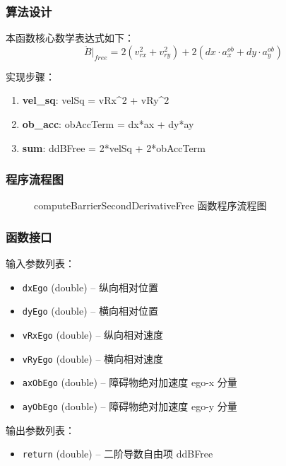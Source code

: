 \documentclass[a4paper,10pt]{article}
\begin{document}
\subsubsection{算法设计}
\par 本函数核心数学表达式如下：
\begin{equation}
\ddot B|_{free} = 2(v_{rx}^2 + v_{ry}^2) + 2(dx \cdot a_x^{ob} + dy \cdot a_y^{ob})
\end{equation}
\par 实现步骤：
\begin{enumerate}
  \item \textbf{vel\_sq}: velSq = vRx\textasciicircum{}2 + vRy\textasciicircum{}2
  \item \textbf{ob\_acc}: obAccTerm = dx*ax + dy*ay
  \item \textbf{sum}: ddBFree = 2*velSq + 2*obAccTerm
\end{enumerate}
\subsubsection{程序流程图}
\begin{figure}[h]
    \centering
    \caption{computeBarrierSecondDerivativeFree 函数程序流程图}
    \label{fig:flow_computeBarrierSecondDerivativeFree}
\end{figure}
\subsubsection{函数接口}
\par 输入参数列表：
\begin{itemize}
  \item \texttt{dxEgo} (double) -- 纵向相对位置
  \item \texttt{dyEgo} (double) -- 横向相对位置
  \item \texttt{vRxEgo} (double) -- 纵向相对速度
  \item \texttt{vRyEgo} (double) -- 横向相对速度
  \item \texttt{axObEgo} (double) -- 障碍物绝对加速度 ego-x 分量
  \item \texttt{ayObEgo} (double) -- 障碍物绝对加速度 ego-y 分量
\end{itemize}
\par 输出参数列表：
\begin{itemize}
  \item \texttt{return} (double) -- 二阶导数自由项 ddBFree
\end{itemize}
\end{document}
